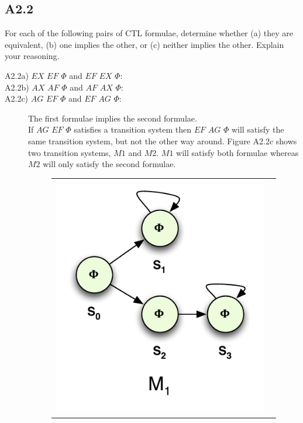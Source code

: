 \documentclass[12pt]{report}
\begin{document}
\subsection*{A2.2}
For each of the following pairs of CTL formulae, determine whether (a) they are equivalent, (b) one implies the other, or (c) neither implies the other. Explain your reasoning.
\begin{description}
	\item[A2.2a) $EX$ $EF$ $\Phi$ and $EF$ $EX$ $\Phi$:]
	
	\item[A2.2b) $AX$ $AF$ $\Phi$ and $AF$ $AX$ $\Phi$:]
	
	\item[A2.2c) $AG$ $EF$ $\Phi$ and $EF$ $AG$ $\Phi$:] The first formulae implies the second formulae.\\
	If $AG$ $EF$ $\Phi$ satisfies a transition system then $EF$ $AG$ $\Phi$ will satisfy the same transition system, but not the other way around. Figure A2.2c shows two transition systems, $M1$ and $M2$. $M1$ will satisfy both formulae whereas $M2$ will only satisfy the second formulae.
	\begin{figure}[H]
		\centering
		\begin{tabular}{ l r }
			\includegraphics[scale=0.75]{../GFX/Answer-A2-2c-1.pdf}

\end{tabular}
\end{figure}
\end{description}
\end{document}
